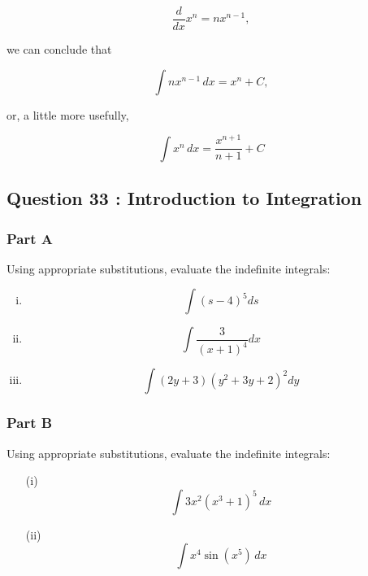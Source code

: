 \documentclass[]{article}
\begin{document}
\[\frac{d}{dx} x^n = n x^{n-1},\]

we can conclude that

\[\int n x^{n-1} \, dx = x^n + C,\]

or, a little more usefully,

\[\int x^n \, dx = \frac{x^{n+1}}{n+1} + C\]
\subsection*{Question 33 : Introduction to Integration}

\subsubsection*{Part A}
Using appropriate substitutions, evaluate the indefinite integrals:

\begin{multicols}{2}
	\begin{enumerate}[(i)]
		
		\item 
		\[ \int (s - 4)^5 ds \]
		\item 
		\[ \int 
		\frac{3}{(x + 1)^4 }dx\]
		\item 
		\[\int 
		(2y + 3)(y^2 + 3y + 2)^2 dy\]
		
	\end{enumerate}
\end{multicols}

\subsubsection*{Part B}
Using appropriate substitutions, evaluate the indefinite integrals:
\begin{multicols}{2}
	\begin{itemize}
		
		\item[(i)]	
		\[\int 3x^2 (x^3+1)^5 \, dx\]
		
		\item[(ii)]
		\[\int x^4 \sin(x^5) \, dx\]
	\end{itemize}
\end{multicols}
\bigskip



\end{document}
